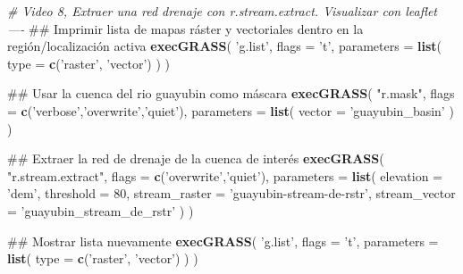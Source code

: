 \documentclass[11pt,]{article}
\newenvironment{Shaded}{\begin{snugshade}}{\end{snugshade}}
\newcommand{\KeywordTok}[1]{\textcolor[rgb]{0.13,0.29,0.53}{\textbf{#1}}}
\newcommand{\DataTypeTok}[1]{\textcolor[rgb]{0.13,0.29,0.53}{#1}}
\newcommand{\DecValTok}[1]{\textcolor[rgb]{0.00,0.00,0.81}{#1}}
\newcommand{\StringTok}[1]{\textcolor[rgb]{0.31,0.60,0.02}{#1}}
\newcommand{\CommentTok}[1]{\textcolor[rgb]{0.56,0.35,0.01}{\textit{#1}}}
\newcommand{\NormalTok}[1]{#1}
\begin{document}
\begin{Shaded}
\begin{Highlighting}[]
\CommentTok{# Video 8, Extraer una red drenaje con r.stream.extract. Visualizar con leaflet ----}
\NormalTok{## Imprimir lista de mapas ráster y vectoriales dentro en la región/localización activa}
\KeywordTok{execGRASS}\NormalTok{(}
  \StringTok{'g.list'}\NormalTok{,}
  \DataTypeTok{flags =} \StringTok{'t'}\NormalTok{,}
  \DataTypeTok{parameters =} \KeywordTok{list}\NormalTok{(}
    \DataTypeTok{type =} \KeywordTok{c}\NormalTok{(}\StringTok{'raster'}\NormalTok{, }\StringTok{'vector'}\NormalTok{)}
\NormalTok{  )}
\NormalTok{)}

\NormalTok{## Usar la cuenca del rio guayubin como máscara}
\KeywordTok{execGRASS}\NormalTok{(}
  \StringTok{"r.mask"}\NormalTok{,}
  \DataTypeTok{flags =} \KeywordTok{c}\NormalTok{(}\StringTok{'verbose'}\NormalTok{,}\StringTok{'overwrite'}\NormalTok{,}\StringTok{'quiet'}\NormalTok{),}
  \DataTypeTok{parameters =} \KeywordTok{list}\NormalTok{(}
    \DataTypeTok{vector =} \StringTok{'guayubin_basin'}
\NormalTok{  )}
\NormalTok{)}

\NormalTok{## Extraer la red de drenaje de la cuenca de interés}
\KeywordTok{execGRASS}\NormalTok{(}
  \StringTok{"r.stream.extract"}\NormalTok{,}
  \DataTypeTok{flags =} \KeywordTok{c}\NormalTok{(}\StringTok{'overwrite'}\NormalTok{,}\StringTok{'quiet'}\NormalTok{),}
  \DataTypeTok{parameters =} \KeywordTok{list}\NormalTok{(}
    \DataTypeTok{elevation =} \StringTok{'dem'}\NormalTok{,}
    \DataTypeTok{threshold =} \DecValTok{80}\NormalTok{,}
    \DataTypeTok{stream_raster =} \StringTok{'guayubin-stream-de-rstr'}\NormalTok{,}
    \DataTypeTok{stream_vector =} \StringTok{'guayubin_stream_de_rstr'}
\NormalTok{  )}
\NormalTok{)}

\NormalTok{## Mostrar lista nuevamente}
\KeywordTok{execGRASS}\NormalTok{(}
  \StringTok{'g.list'}\NormalTok{,}
  \DataTypeTok{flags =} \StringTok{'t'}\NormalTok{,}
  \DataTypeTok{parameters =} \KeywordTok{list}\NormalTok{(}
    \DataTypeTok{type =} \KeywordTok{c}\NormalTok{(}\StringTok{'raster'}\NormalTok{, }\StringTok{'vector'}\NormalTok{)}
\NormalTok{  )}
\NormalTok{)}


\end{Highlighting}
\end{Shaded}
\end{document}
